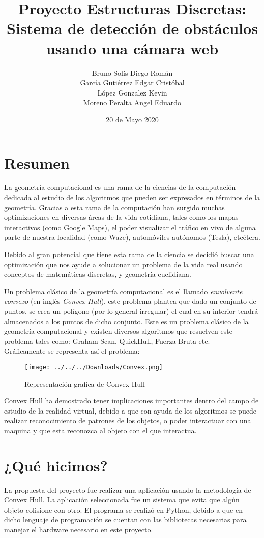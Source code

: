 \documentclass[11pt]{article}
\title{Proyecto Estructuras Discretas: Sistema de detección de obstáculos usando una cámara web}
\author{Bruno Solís Diego Román\\García Gutiérrez Edgar Cristóbal\\López Gonzalez Kevin\\Moreno Peralta Angel Eduardo }
\date{20 de Mayo 2020}
\begin{document}
\maketitle
\section{Resumen}
\noindent La geometría computacional es una rama de la ciencias de la computación dedicada al estudio de los algoritmos que pueden ser expresados en términos de la geometría. Gracias a esta rama de la computación han surgido muchas optimizaciones en diversas áreas de la vida cotidiana, tales como los mapas interactivos (como Google Maps), el poder visualizar el tráfico en vivo de alguna parte de nuestra localidad (como Waze), automóviles autónomos (Tesla), etcétera.

Debido al gran potencial que tiene esta rama de la ciencia se decidió buscar una optimización que nos ayude a solucionar un problema de la vida real usando conceptos de matemáticas discretas, y geometría euclidiana.

Un problema clásico de la geometría computacional es el llamado \textit{envolvente convexo} (en inglés \textit{Convex Hull}), este problema plantea que dado un conjunto de puntos, se crea un polígono (por lo general irregular) el cual en su interior tendrá almacenados a los puntos de dicho conjunto. Este es un problema clásico de la geometría computacional y existen diversos algoritmos que resuelven este problema tales como: Graham Scan, QuickHull, Fuerza Bruta etc.\\
Gráficamente se representa así el problema:
\begin{figure}[h]
\centering
\texttt{[image: ../../../Downloads/Convex.png]}
\caption{Representación grafica de Convex Hull}
\end{figure}

Convex Hull ha demostrado tener implicaciones importantes dentro del campo de estudio de la realidad virtual, debido a que con ayuda de los algoritmos se puede realizar reconocimiento de patrones de los objetos, o poder interactuar con una maquina y que esta reconozca al objeto con el que interactua.   
\section{¿Qué hicimos?}
\noindent La propuesta del proyecto fue realizar una aplicación usando la metodología de Convex Hull. La aplicación seleccionada fue un sistema que evita que algún objeto colisione con otro. El programa se realizó en Python, debido a que en dicho lenguaje de programación se cuentan con las bibliotecas necesarias para manejar el hardware necesario en este proyecto.
\end{document}
